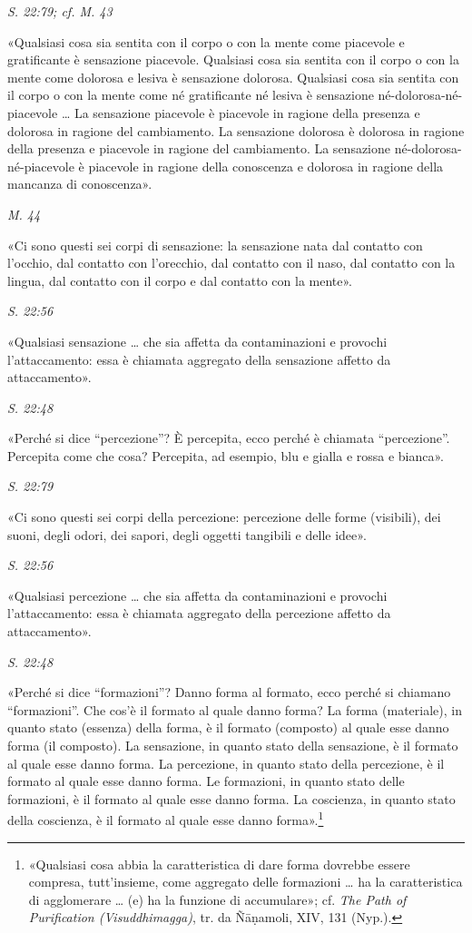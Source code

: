 \emph{S. 22:79; cf. M. 43}


«Qualsiasi cosa sia sentita con il corpo o con la mente come piacevole e
gratificante è sensazione piacevole. Qualsiasi cosa sia sentita con il
corpo o con la mente come dolorosa e lesiva è sensazione dolorosa.
Qualsiasi cosa sia sentita con il corpo o con la mente come né
gratificante né lesiva è sensazione né-dolorosa-né-piacevole … La
sensazione piacevole è piacevole in ragione della presenza e dolorosa in
ragione del cambiamento. La sensazione dolorosa è dolorosa in ragione
della presenza e piacevole in ragione del cambiamento. La sensazione
né-dolorosa-né-piacevole è piacevole in ragione della conoscenza e
dolorosa in ragione della mancanza di conoscenza».


\emph{M. 44}


«Ci sono questi sei corpi di sensazione: la sensazione nata dal contatto
con l’occhio, dal contatto con l’orecchio, dal contatto con il naso, dal
contatto con la lingua, dal contatto con il corpo e dal contatto con la
mente».


\emph{S. 22:56}


«Qualsiasi sensazione … che sia affetta da contaminazioni e provochi
l’attaccamento: essa è chiamata aggregato della sensazione affetto da
attaccamento».


\emph{S. 22:48}


«Perché si dice “percezione”? È percepita, ecco perché è chiamata
“percezione”. Percepita come che cosa? Percepita, ad esempio, blu e
gialla e rossa e bianca».


\emph{S. 22:79}


«Ci sono questi sei corpi della percezione: percezione delle forme
(visibili), dei suoni, degli odori, dei sapori, degli oggetti tangibili
e delle idee».


\emph{S. 22:56}


«Qualsiasi percezione … che sia affetta da contaminazioni e provochi
l’attaccamento: essa è chiamata aggregato della percezione affetto da
attaccamento».


\emph{S. 22:48}


«Perché si dice “formazioni”? Danno forma al formato, ecco perché si
chiamano “formazioni”. Che cos’è il formato al quale danno forma? La
forma (materiale), in quanto stato (essenza) della forma, è il formato
(composto) al quale esse danno forma (il composto). La sensazione, in
quanto stato della sensazione, è il formato al quale esse danno forma.
La percezione, in quanto stato della percezione, è il formato al quale
esse danno forma. Le formazioni, in quanto stato delle formazioni, è il
formato al quale esse danno forma. La coscienza, in quanto stato della
coscienza, è il formato al quale esse danno forma».\footnote{«Qualsiasi cosa abbia la caratteristica di dare forma dovrebbe essere compresa, tutt’insieme, come aggregato delle formazioni … ha la caratteristica di agglomerare … (e) ha la funzione di accumulare»; cf. \emph{The Path of Purification (Visuddhimagga)}, tr. da Ñāṇamoli, XIV, 131 (Nyp.).}


